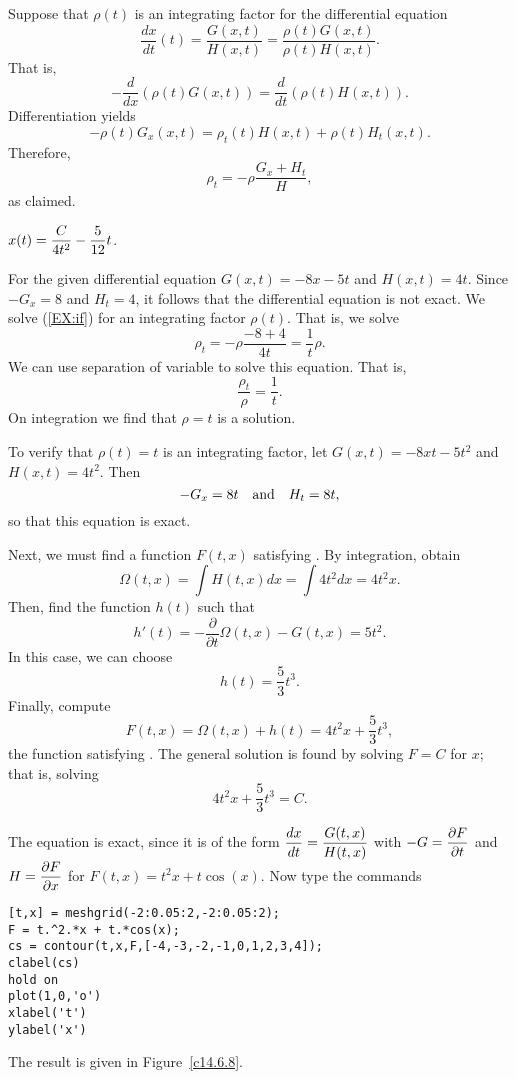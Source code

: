 Suppose that $\rho(t)$ is an integrating factor for the differential equation
\[
\frac{dx}{dt}(t) = \frac{G(x,t)}{H(x,t)}=\frac{\rho(t)G(x,t)}{\rho(t)H(x,t)}.
\]
That is,
\[
-\frac{d}{dx}(\rho(t)G(x,t)) = \frac{d}{dt}(\rho(t)H(x,t)).
\]
Differentiation yields
\[
-\rho(t)G_x(x,t) = \rho_t(t)H(x,t) + \rho(t)H_t(x,t).
\]
Therefore,
\begin{equation} \label{EX:if}
\rho_t = -\rho\frac{G_x+H_t}{H},
\end{equation}
as claimed.

 \ans $x(t) = \displaystyle\frac{C}{4t^2} - \frac{5}{12}t$.

\soln  For the given differential equation $G(x,t)=-8x-5t$ and $H(x,t)=4t$. 
Since $-G_x=8$ and $H_t=4$, it follows that the differential equation is not
exact.  We solve (\ref{EX:if}) for an integrating factor $\rho(t)$.  That is,
we solve
\[
\rho_t = -\rho\frac{-8+4}{4t} = \frac{1}{t}\rho.
\]
We can use separation of variable to solve this equation.  That is,
\[
\frac{\rho_t}{\rho} =  \frac{1}{t}.
\]
On integration we find that $\rho=t$ is a solution.

To verify that $\rho(t)=t$ is an integrating factor, let $G(x,t)=-8xt-5t^2$
and $H(x,t)=4t^2$.  Then 
\[
-G_x = 8t \quad\mbox{and}\quad H_t = 8t,
\]
so that this equation is exact.

Next, we must find a function $F(t,x)$ satisfying .  By
integration, obtain
\[
\Omega(t,x) = \int H(t,x)dx = \int 4t^2dx = 4t^2x.
\]
Then, find the function $h(t)$ such that
\[
h'(t) = -\frac{\partial}{\partial t}\Omega(t,x) - G(t,x) = 5t^2.
\]
In this case, we can choose 
\[
h(t) =  \frac{5}{3}t^3.  
\]
Finally, compute
\[
F(t,x) = \Omega(t,x) + h(t) = 4t^2x + \frac{5}{3}t^3,
\]
the function satisfying .  The general solution is found by 
solving $F=C$ for $x$; that is, solving
\[
4t^2x + \frac{5}{3}t^3 = C.
\]

  The equation is exact, since it is of the form
$\displaystyle\frac{dx}{dt} = \frac{G(t,x)}{H(t,x)}$ with
$-G=\displaystyle\frac{\partial F}{\partial t}$ and
$H=\displaystyle\frac{\partial F}{\partial x}$ for $F(t,x) = t^2 x + t\cos(x)$.
Now type the commands
\begin{verbatim}
[t,x] = meshgrid(-2:0.05:2,-2:0.05:2);
F = t.^2.*x + t.*cos(x);
cs = contour(t,x,F,[-4,-3,-2,-1,0,1,2,3,4]);
clabel(cs)
hold on
plot(1,0,'o')
xlabel('t')
ylabel('x')
\end{verbatim}
The result is given in Figure~\ref{c14.6.8}.
\begin{figure}[htb]
     \centerline{%
     }
\end{figure} 



